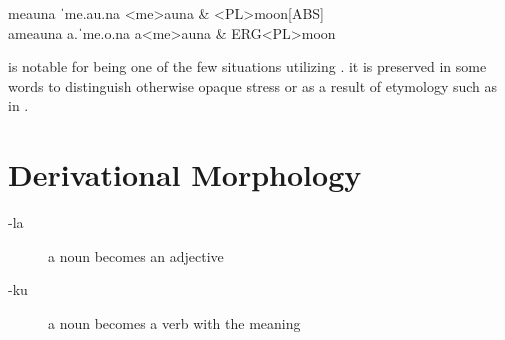 \begin{subexamples}
  \ex
    \preamble meauna
    \pronunciation ˈme.au.na
    \gloss
      <me>auna & <PL>moon[ABS] \\
  \ex
    \preamble ameauna
    \pronunciation a.ˈme.o.na
    \gloss
      a\allo <me>auna & ERG\allo <PL>moon \\
    \end{subexamples}

 is notable for being one of the few situations utilizing . it is preserved in some words to distinguish otherwise opaque stress or as a result of etymology such as in .

\section{Derivational Morphology}
\begin{description}
  \item[-la] a noun becomes an adjective 
  \item[-ku] a noun becomes a verb with the meaning  
\end{description}